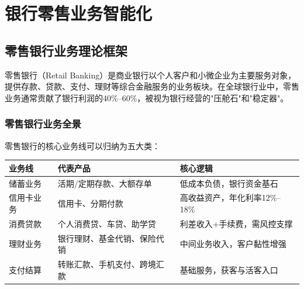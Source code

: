 
\chapter{银行零售业务智能化}

\section{零售银行业务理论框架}

零售银行（Retail Banking）是商业银行以个人客户和小微企业为主要服务对象，提供存款、贷款、支付、理财等综合金融服务的业务板块。在全球银行业中，零售业务通常贡献了银行利润的40\%--60\%，被视为银行经营的"压舱石"和"稳定器"。

\subsection{零售银行业务全景}

零售银行的核心业务线可以归纳为五大类：

\begin{table}[H]
\centering
\begin{tabular}{lp{3.5cm}p{6cm}}
\toprule
\textbf{业务线} & \textbf{代表产品} & \textbf{核心逻辑} \\
\midrule
储蓄业务 & 活期/定期存款、大额存单 & 低成本负债，银行资金基石 \\
信用卡业务 & 信用卡、分期付款 & 高收益资产，年化利率12\%--18\% \\
消费贷款 & 个人消费贷、车贷、助学贷 & 利差收入+手续费，需风控支撑 \\
理财业务 & 银行理财、基金代销、保险代销 & 中间业务收入，客户黏性增强 \\
支付结算 & 转账汇款、手机支付、跨境汇款 & 基础服务，获客与活客入口 \\
\bottomrule
\end{tabular}
\end{table}

